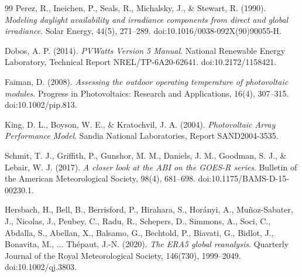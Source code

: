 \documentclass[../main.tex]{subfiles}
\begin{document}
\begin{thebibliography}{99}
Perez, R., Ineichen, P., Seals, R., Michalsky, J., \& Stewart, R. (1990).
\textit{Modeling daylight availability and irradiance components from direct and global irradiance}.
Solar Energy, 44(5), 271--289. doi:10.1016/0038-092X(90)90055-H.

Dobos, A. P. (2014).
\textit{PVWatts Version 5 Manual}.
National Renewable Energy Laboratory, Technical Report NREL/TP-6A20-62641. doi:10.2172/1158421.

Faiman, D. (2008).
\textit{Assessing the outdoor operating temperature of photovoltaic modules}.
Progress in Photovoltaics: Research and Applications, 16(4), 307--315. doi:10.1002/pip.813.

King, D. L., Boyson, W. E., \& Kratochvil, J. A. (2004).
\textit{Photovoltaic Array Performance Model}.
Sandia National Laboratories, Report SAND2004-3535.

Schmit, T. J., Griffith, P., Gunshor, M. M., Daniels, J. M., Goodman, S. J., \& Lebair, W. J. (2017).
\textit{A closer look at the ABI on the GOES-R series}.
Bulletin of the American Meteorological Society, 98(4), 681--698. doi:10.1175/BAMS-D-15-00230.1.

Hersbach, H., Bell, B., Berrisford, P., Hirahara, S., Horányi, A., Muñoz-Sabater, J., Nicolas, J., Peubey, C., Radu, R., Schepers, D., Simmons, A., Soci, C., Abdalla, S., Abellan, X., Balsamo, G., Bechtold, P., Biavati, G., Bidlot, J., Bonavita, M., ... Thépaut, J.-N. (2020).
\textit{The ERA5 global reanalysis}.
Quarterly Journal of the Royal Meteorological Society, 146(730), 1999--2049. doi:10.1002/qj.3803.

\end{thebibliography}
\end{document}
